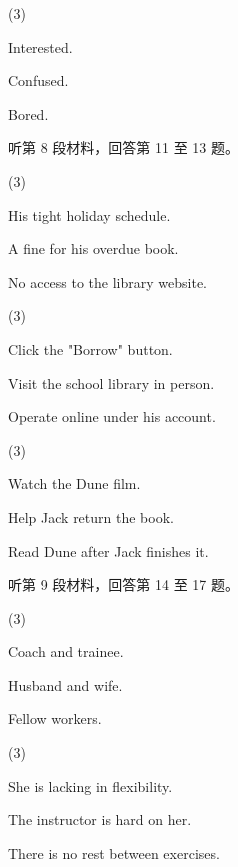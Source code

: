 \documentclass{英语试卷}
\begin{document}
\begin{choices}(3)
  \item Interested.
  \item Confused.
  \item Bored.
\end{choices}
\par 听第 8 段材料，回答第 11 至 13 题。\par
{}
\begin{choices}(3)
  \item His tight holiday schedule.
  \item A fine for his overdue book.
  \item No access to the library website.
\end{choices}
\begin{choices}(3)
  \item Click the "Borrow" button.
  \item Visit the school library in person.
  \item Operate online under his account.
\end{choices}
\begin{choices}(3)
  \item Watch the Dune film.
  \item Help Jack return the book.
  \item Read Dune after Jack finishes it.
\end{choices}
\par 听第 9 段材料，回答第 14 至 17 题。\par
{}
\begin{choices}(3)
  \item Coach and trainee.
  \item Husband and wife.
  \item Fellow workers.
\end{choices}
\begin{choices}(3)
  \item She is lacking in flexibility.
  \item The instructor is hard on her.
  \item There is no rest between exercises.
\end{choices}
\end{document}
